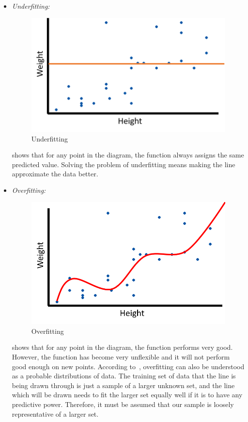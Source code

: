\begin{itemize}
	\item \textit{Underfitting:}
	\begin{figure}
		\includegraphics[width=\linewidth]{img/underfit.png}
		\caption{Underfitting~\cite{gs}}
		\label{fig:underfit}
	\end{figure}
 shows that for any point in the diagram, the function always assigns the same predicted value. Solving the problem of underfitting means making the line approximate the data better.
	\item \textit{Overfitting:} 
		\begin{figure}
		\includegraphics[width=\linewidth]{img/overfit.png}
		\caption{Overfitting~\cite{gs}}
		\label{fig:overfit}
	\end{figure}
 shows that for any point in the diagram, the function performs very good. However, the function has become very unflexible and it will not perform good enough on new points. According to~\cite{tfidf}, overfitting can also be understood as a probable distributions of data. The training set of data that the line is being drawn through is just a sample of a larger unknown set, and the line which will be drawn needs to fit the larger set equally well if it is to have any predictive power. Therefore, it must be assumed that our sample is loosely representative of a larger set.
\end{itemize}
